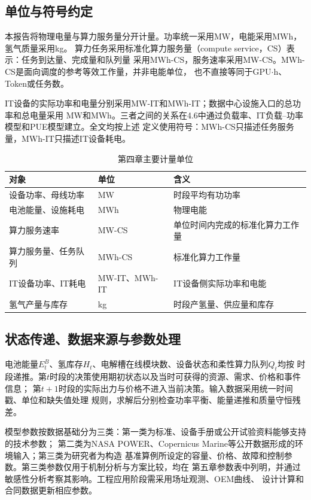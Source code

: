 \subsection{单位与符号约定}

本报告将物理电量与算力服务量分开计量。功率统一采用MW，电能采用MWh，氢气质量采用kg。
算力任务采用标准化算力服务量（compute service，CS）表示：任务到达量、完成量和队列量
采用MWh-CS，服务速率采用MW-CS。MWh-CS是面向调度的参考等效工作量，并非电能单位，
也不直接等同于GPU$\cdot$h、Token或任务数。

IT设备的实际功率和电量分别采用MW-IT和MWh-IT；数据中心设施入口的总功率和总电量采用
MW和MWh。三者之间的关系在4.6中通过负载率、IT负载--功率模型和PUE模型建立。全文均按上述
定义使用符号：MWh-CS只描述任务服务量，MWh-IT只描述IT设备耗电。

\begin{table}[H]
\centering
\caption{第四章主要计量单位}
\label{tab:unit-convention}
\begin{tabularx}{\textwidth}{p{3.0cm}p{2.2cm}X}
\toprule
对象 & 单位 & 含义 \\
\midrule
设备功率、母线功率 & MW & 时段平均有功功率 \\
电池能量、设施耗电 & MWh & 物理电能 \\
算力服务速率 & MW-CS & 单位时间内完成的标准化算力工作量 \\
算力服务量、任务队列 & MWh-CS & 标准化算力工作量 \\
IT设备功率、IT耗电 & MW-IT、MWh-IT & IT设备侧实际功率和电能 \\
氢气产量与库存 & kg & 时段产氢量、供应量和库存 \\
\bottomrule
\end{tabularx}
\end{table}

\subsection{状态传递、数据来源与参数处理}

电池能量$E_t^B$、氢库存$H_t$、电解槽在线模块数、设备状态和柔性算力队列$Q_t$均按
时段递推。第$t$时段的决策使用期初状态以及当时可获得的资源、需求、价格和事件信息；
第$t+1$时段的实际出力与价格不进入当前决策。输入数据采用统一时间戳、单位和缺失值处理
规则，求解后分别检查功率平衡、能量递推和质量守恒残差。

模型参数按数据基础分为三类：第一类为标准、设备手册或公开试验资料能够支持的技术参数；
第二类为NASA POWER、Copernicus Marine等公开数据形成的环境输入；第三类为研究者为构造
基准算例所设定的容量、价格、故障和控制参数。第三类参数仅用于机制分析与方案比较，均在
第五章参数表中列明，并通过敏感性分析考察其影响。工程应用阶段需采用场址观测、OEM曲线、
设计计算和合同数据更新相应参数。
